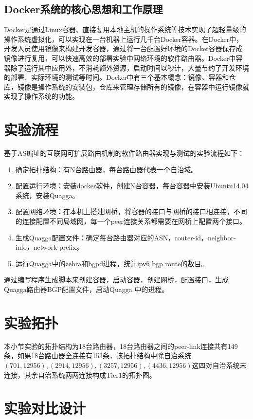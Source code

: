 \subsection{Docker系统的核心思想和工作原理}

Docker\cite{docker}是通过Linux容器、直接复用本地主机的操作系统等技术实现了超轻量级的操作系统虚拟化，可以实现在一台机器上运行几千台Docker容器。在Docker中，开发人员使用镜像来构建开发容器，通过将一台配置好环境的Docker容器保存成镜像进行复用，可以快速高效的部署实验中网络环境的软件路由器。Docker中容器除了运行其中应用外，不消耗额外资源，启动时间以秒计，大量节约了开发环境的部署、实际环境的测试等时间。Docker中有三个基本概念：镜像、容器和仓库，镜像是操作系统的安装包，仓库来管理存储所有的镜像，在容器中运行镜像就实现了操作系统的功能。

\section{实验流程}
基于AS编址的互联网可扩展路由机制的软件路由器实现与测试的实验流程如下：

\begin{enumerate}
\item 确定拓扑结构：有N台路由器，每台路由器代表一个自治域。
\item 配置运行环境：安装docker软件，创建N台容器，每台容器中安装Ubuntu14.04系统，安装Quagga。
\item 配置网络环境：在本机上搭建网桥，将容器的接口与网桥的接口相连接，不同的连接配置不同局域网，每一个peer连接关系都需要在网桥上配置两个接口。
\item 生成Quagga配置文件：确定每台路由器对应的ASN，router-id，neighbor-info，network-prefix。
\item 运行Quagga中的zebra和bgpd进程，统计ipv6 bgp route的数目。
\end{enumerate}

通过编写程序生成脚本来创建容器，启动容器，创建网桥，配置接口，生成Quagga路由器BGP配置文件，启动Quagga 中的进程。

\section{实验拓扑}
\label{sect:topology}
本小节实验的拓扑结构为18台路由器，18台路由器之间的peer-link连接共有149条，如果18台路由器全连接有153条，该拓扑结构中除自治系统$(701,12956),(2914,12956),(3257,12956),(4436,12956)$这四对自治系统未连接，其余自治系统两两连接构成Tier1的拓扑图。
\section{实验对比设计}

